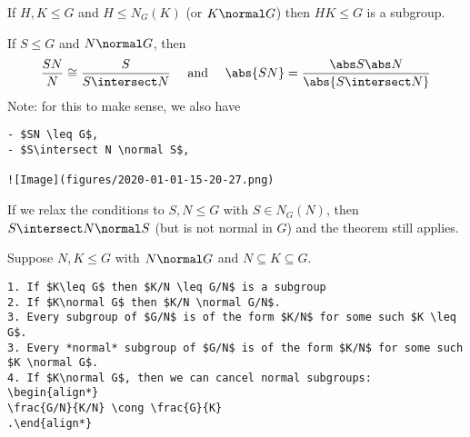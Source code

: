 \begin{proposition}

If \(H,K \leq G\) and \(H \leq N_G(K)\) (or \(K \normal G\)) then
\(HK \leq G\) is a subgroup.

\end{proposition}

\begin{theorem}

If \(S \leq G\) and \(N \normal G\), then \[
    \frac{SN}{N} \cong \frac{S}{S\intersect N} \quad \text{ and }\quad \abs{SN} = \frac{\abs S \abs N}{\abs{S\intersect N}}
    \] Note: for this to make sense, we also have

\begin{verbatim}
- $SN \leq G$,
- $S\intersect N \normal S$,

![Image](figures/2020-01-01-15-20-27.png)
\end{verbatim}

\end{theorem}

\begin{corollary}

If we relax the conditions to \(S, N \leq G\) with \(S \in N_G(N)\),
then \(S\intersect N \normal S\) (but is not normal in \(G\)) and the
theorem still applies.

\end{corollary}

\begin{theorem}

Suppose \(N, K \leq G\) with \(N \normal G\) and
\(N\subseteq K \subseteq G\).

\begin{verbatim}
1. If $K\leq G$ then $K/N \leq G/N$ is a subgroup
2. If $K\normal G$ then $K/N \normal G/N$.
3. Every subgroup of $G/N$ is of the form $K/N$ for some such $K \leq G$.
3. Every *normal* subgroup of $G/N$ is of the form $K/N$ for some such $K \normal G$.
4. If $K\normal G$, then we can cancel normal subgroups:
\begin{align*}
\frac{G/N}{K/N} \cong \frac{G}{K}
.\end{align*}
\end{verbatim}

\end{theorem}

